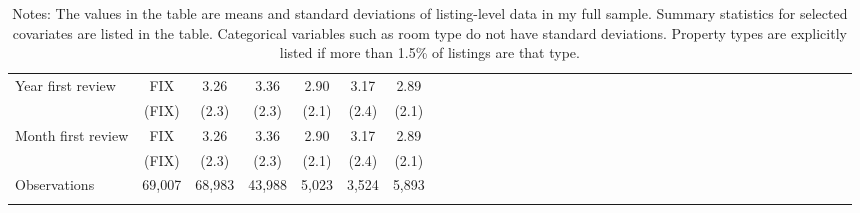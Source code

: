 {\begin{longtable}{l*{6}{c|c|cccc}}
Year first review    & FIX   &      3.26	&      3.36  &      2.90		&    3.17 		&	 2.89\\
& (FIX)    &     (2.3)         &     (2.3)         &     (2.1)         &     (2.4)         & (2.1)\\
Month first review    & FIX   &      3.26	&      3.36  &      2.90		&    3.17 		&	 2.89\\
& (FIX)    &     (2.3)         &     (2.3)         &     (2.1)         &     (2.4)         & (2.1)\\

\hline
Observations  & 69,007  & 68,983   &       43,988         &       5,023         &       3,524   & 5,893      \\
\hline\hline
\caption*{Notes: The values in the table are means and standard deviations of listing-level data in my full sample. Summary statistics for selected covariates are listed in the table. Categorical variables such as room type do not have standard deviations. Property types are explicitly listed if more than 1.5\% of listings are that type.}

\end{longtable}
}
\normalsize



